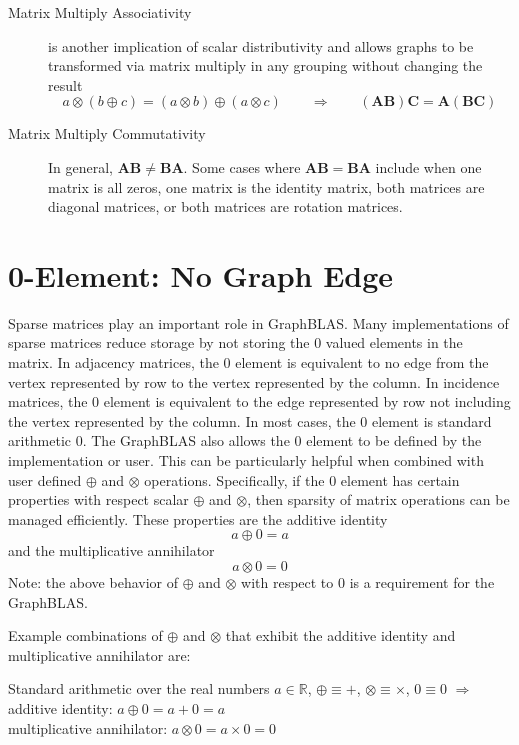 \begin{description}
\item[Matrix Multiply Associativity] is another implication of scalar distributivity and allows graphs to be transformed via matrix multiply in any grouping without changing the result
  $$
      a \otimes (b \oplus c) = (a \otimes b) \oplus (a \otimes c)   ~~~~~~~~~ \Rightarrow ~~~~~~~~~
      (\mathbf{A} \mathbf{B}) \mathbf{C} = \mathbf{A} (\mathbf{B} \mathbf{C})
  $$
\item[Matrix Multiply Commutativity] In general, $\mathbf{A} \mathbf{B} \neq \mathbf{B} \mathbf{A}$.  Some cases where $\mathbf{A} \mathbf{B} = \mathbf{B} \mathbf{A}$ include when one matrix is all zeros, one matrix is the identity matrix, both matrices are diagonal matrices, or both matrices are rotation matrices.

\end{description}


\section{0-Element: No Graph Edge}
  Sparse matrices play an important role in GraphBLAS.  Many implementations of sparse matrices reduce storage by not storing the 0 valued elements in the matrix.  In adjacency matrices, the 0 element is equivalent to no edge from the vertex represented by row to the vertex represented by the column. In incidence matrices, the 0 element is equivalent to the edge represented by row not including the vertex represented by the column.  In most cases, the 0 element is standard arithmetic 0.  The GraphBLAS also allows the 0 element to be defined by the implementation or user.  This can be particularly helpful when combined with user defined $\oplus$ and $\otimes$ operations.  Specifically, if the 0 element has certain properties with respect scalar $\oplus$ and $\otimes$, then sparsity of matrix operations can be managed efficiently.  These properties are the additive identity
$$
     a \oplus 0 = a
$$
and the multiplicative annihilator
$$
     a \otimes 0 = 0
$$
Note: the above behavior of $\oplus$ and $\otimes$ with respect to 0 is a requirement for the GraphBLAS.

  Example combinations of $\oplus$ and $\otimes$ that exhibit the additive identity and multiplicative annihilator are:

Standard arithmetic over the real numbers $a \in \mathbb{R}$, 
$\oplus \equiv +$, $\otimes \equiv \times$, $0 \equiv 0$ $\Rightarrow$ \\
additive identity: $a \oplus 0  =  a + 0 = a$ \\
multiplicative annihilator: $a \otimes 0 = a \times 0 = 0$

